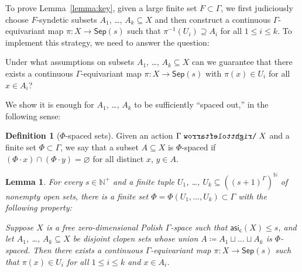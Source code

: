 \documentclass[11pt,reqno,psamsfonts]{amsart}
\theoremstyle{bfnote}
\newtheorem{lemma}[theo]{Lemma}
\theoremstyle{definition}
\newtheorem{defn}[theo]{Definition}
\theoremstyle{remark}
\newcommand{\0}{\varnothing}
\renewcommand{\leq}{\leqslant}
\newcommand{\defeq}{\coloneqq}
\newcommand{\emphd}[1]{{\fontseries{b}\selectfont\textsf{#1}}}
\newcommand{\acts}{\mathrel{\reflectbox{$\righttoleftarrow$}}}
\newcommand{\G}{\Gamma}
\newcommand{\N}{\mathbb{N}}
\newcommand{\asi}{\mathsf{asi}}
\newcommand{\casi}{\asi_{\mathsf{c}}}
\newcommand{\Sep}{\mathsf{Sep}}
\numberwithin{equation}{section}
\begin{document}
    To prove Lemma~\ref{lemma:key}, given a large finite set $F \subset \G$, we first 
    judiciously choose $F$-syndetic
    subsets $A_1$, \ldots, $A_k \subseteq X$ %
        and then construct a continuous $\G$-equivariant map $\pi \colon X \to \Sep(s)$ such that $\pi^{-1}(U_i) \supseteq A_i$ for all $1 \leq i \leq k$. To implement this strategy, we need to answer the question:
    \begin{tcolorbox}[width=\linewidth, sharp corners=all, colback=white!95!black, boxrule=0pt,colframe=white] 
        Under what assumptions on subsets $A_1$, \ldots, $A_k \subseteq X$ can we guarantee that there exists a continuous $\G$-equivariant map $\pi \colon X \to \Sep(s)$  with $\pi(x) \in U_i$ for all $x \in A_i$?
    \end{tcolorbox}
    We show it is enough for $A_1$, \ldots, $A_k$ to be sufficiently ``spaced out,'' in the following sense:

    \begin{defn}[$\Phi$-spaced sets]
        Given an action $\G \acts X$ and a finite set $\Phi \subset \G$, we say that a subset $A \subseteq X$ is \emphd{$\Phi$-spaced} if $(\Phi \cdot x) \cap (\Phi \cdot y) = \0$ for all distinct $x$, $y \in A$. %
    \end{defn}

    \begin{lemma}\label{lemma:from_separation_to_map}
       For every $s \in \N^+$ and a finite tuple $U_1$, \ldots, $U_k \subseteq ((s+1)^\G)^\N$ of nonempty open sets, there is a finite set $\Phi = \Phi(U_1, \ldots, U_k) \subset \G$ with the following property:

       \smallskip
       
       \noindent Suppose $X$ is a free zero-dimensional Polish $\G$-space such that $\casi(X) \leq s$, and let $A_1$, \ldots, $A_k \subseteq X$ be disjoint clopen sets whose union $A \defeq A_1 \sqcup \ldots \sqcup A_k$ is $\Phi$-spaced. Then there exists a continuous $\G$-equivariant map $\pi \colon X \to \Sep(s)$ such that $\pi(x) \in U_i$
        for all $1 \leq i \leq k$ and $x \in A_i$.
    \end{lemma}
\end{document}
